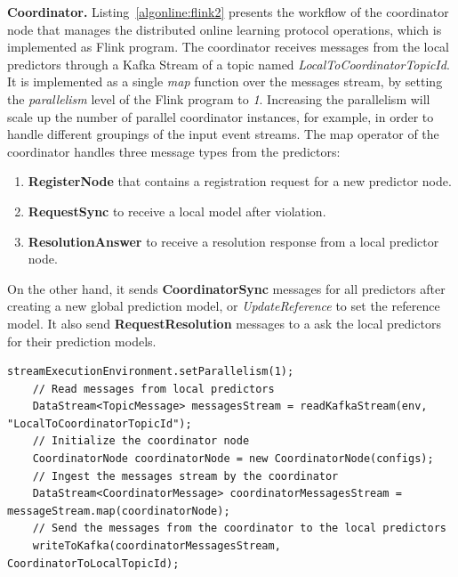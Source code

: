 \textbf{Coordinator.} Listing~\ref{algonline:flink2} presents the workflow of the coordinator node that manages the distributed online learning protocol operations, which is implemented as Flink program. The coordinator receives messages from the local predictors through a Kafka Stream of a topic named \textit{LocalToCoordinatorTopicId}. It is implemented as a single \textit{map} function over the messages stream, by setting the \textit{parallelism} level of the Flink program to \textit{1}. Increasing the parallelism will scale up the number of parallel coordinator instances, for example, in order to handle different groupings of the input event streams. The map operator of the coordinator  handles three message types from the predictors: \begin{enumerate}[]
	\item \textbf{RegisterNode} that contains  a registration request for a new predictor node.
	\item \textbf{RequestSync} to receive a local model after violation.
	\item \textbf{ResolutionAnswer} to receive a resolution response from a local predictor node.  
\end{enumerate}  
 On the other hand, it sends \textbf{CoordinatorSync} messages for all predictors after creating a new global prediction model, or \textit{UpdateReference} to set the reference model. It also send  \textbf{RequestResolution} messages to a ask the local predictors for their prediction models.
 
\begin{center}
	\centering
\begin{lstlisting}[caption={The coordinator Flink program.},label={algonline:flink2},frame=single]
    streamExecutionEnvironment.setParallelism(1);
	// Read messages from local predictors
	DataStream<TopicMessage> messagesStream = readKafkaStream(env, "LocalToCoordinatorTopicId");	
	// Initialize the coordinator node
	CoordinatorNode coordinatorNode = new CoordinatorNode(configs);
	// Ingest the messages stream by the coordinator	
	DataStream<CoordinatorMessage> coordinatorMessagesStream = messageStream.map(coordinatorNode);	
	// Send the messages from the coordinator to the local predictors
	writeToKafka(coordinatorMessagesStream, CoordinatorToLocalTopicId);
\end{lstlisting}
\end{center}
